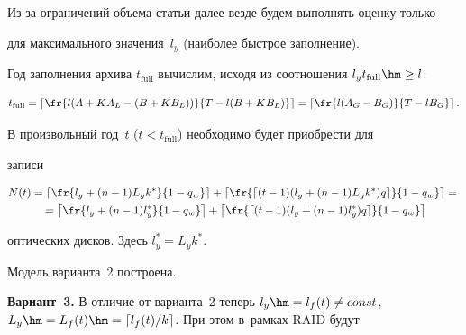   


  Из-за ограничений объема статьи далее везде будем выполнять оценку только 


для максимального значения~$l_y$ (наиболее быстрое заполнение).


  


  Год заполнения архива $t_{\mathrm{full}}$ вычислим, исходя из соотношения $l_y 


t_{\mathrm{full}}\hm\geq l$:


  $$


  t_{\mathrm{full}} = \left\lceil \fr{l(A+KA_L-(B+KB_L))}{T-l(B+KB_L)}\right\rceil = 


\left\lceil \fr{l(A_G-B_G)}{T-lB_G}\right\rceil.


  $$


  


  В произвольный год~$t$ ($t<t_{\mathrm{full}}$) необходимо будет приобрести для 


записи


  \begin{multline}


  N(t)= \left\lceil \fr{l_y+(n-1)L_yk^*}{1-q_w}\right\rceil +\left\lceil \fr{\lceil (t-


1)(l_y+(n-1)L_y k^*)q\rceil}{1-q_w}\right\rceil ={}\\


{}= \left\lceil \fr{l_y+(n-1)l_y^*}{1-


q_w}\right\rceil +\left\lceil \fr{\lceil (t-1)(l_y+(n-1)l_y^*)q\rceil}{1-q_w}\right\rceil


  \label{e3-che}


    \end{multline}


  оптических дисков. Здесь $l_y^*=L_yk^*$.


  


  Модель варианта~2 построена.


  


  \smallskip


  


  \noindent


  \textbf{Вариант~3.} В отличие от варианта~2 теперь $l_y\hm= l_f(t)\not= 


const$, $L_y\hm= L_f(t)\hm= \lceil l_f(t)/k\rceil$. При этом в~рамках RAID будут 



